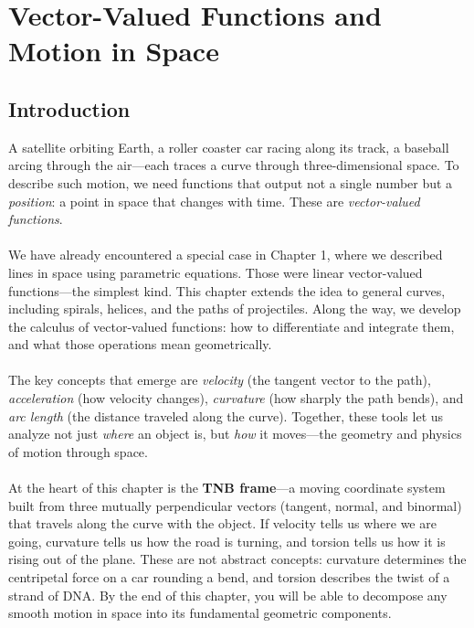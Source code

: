 
\chapter{Vector-Valued Functions and Motion in Space}

\section*{Introduction}

A satellite orbiting Earth, a roller coaster car racing along its track, a baseball arcing through the air---each traces a curve through three-dimensional space. To describe such motion, we need functions that output not a single number but a \textit{position}: a point in space that changes with time. These are \textit{vector-valued functions}.\\ \\
\noindent We have already encountered a special case in Chapter 1, where we described lines in space using parametric equations. Those were linear vector-valued functions---the simplest kind. This chapter extends the idea to general curves, including spirals, helices, and the paths of projectiles. Along the way, we develop the calculus of vector-valued functions: how to differentiate and integrate them, and what those operations mean geometrically.\\ \\
\noindent The key concepts that emerge are \textit{velocity} (the tangent vector to the path), \textit{acceleration} (how velocity changes), \textit{curvature} (how sharply the path bends), and \textit{arc length} (the distance traveled along the curve). Together, these tools let us analyze not just \textit{where} an object is, but \textit{how} it moves---the geometry and physics of motion through space.\\ \\
\noindent At the heart of this chapter is the \textbf{TNB frame}---a moving coordinate system built from three mutually perpendicular vectors (tangent, normal, and binormal) that travels along the curve with the object. If velocity tells us where we are going, curvature tells us how the road is turning, and torsion tells us how it is rising out of the plane. These are not abstract concepts: curvature determines the centripetal force on a car rounding a bend, and torsion describes the twist of a strand of DNA. By the end of this chapter, you will be able to decompose any smooth motion in space into its fundamental geometric components.
\newpage 






